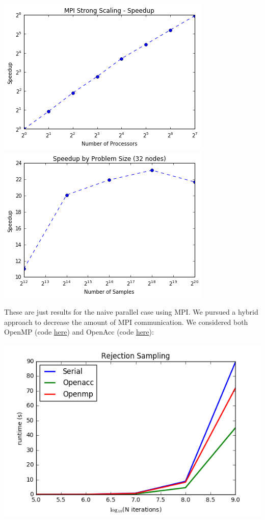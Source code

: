 \documentclass{article}
\begin{document}
\includegraphics[width=\textwidth]{mpi-strong-speedup.png}
\includegraphics[width=\textwidth]{mpi-speedup-sample.png}

These are just results for the naive parallel case using MPI. We pursued a
hybrid approach to decrease the amount of MPI communication. We considered both
OpenMP (code
\href{https://github.com/asross/cs205-project/blob/master/odyssey_rejection_sampling/openmp_dir/openmp.c}{here})
and OpenAcc (code
\href{https://github.com/asross/cs205-project/blob/master/odyssey_rejection_sampling/openacc_dir/openacc.cpp}{here}):

\includegraphics[width=\textwidth]{openaccmp.png}
\end{document}
